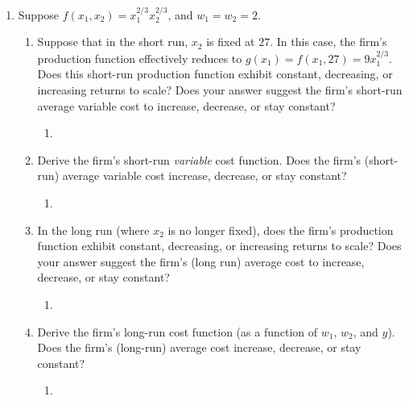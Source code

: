 \documentclass[11pt]{article}
\begin{document}
\begin{enumerate}
\item Suppose $f(x_{1},x_{2})=x_{1}^{2/3}x_{2}^{2/3}$, and $w_{1}=w_{2}=2$.
    \begin{enumerate}
        \item Suppose that in the short run, $x_{2}$ is fixed at $27$. In this case, the firm's production function effectively reduces to $g(x_{1})=f(x_{1},27)=9x_{1}^{2/3}$. Does this short-run production function exhibit constant, decreasing, or increasing returns to scale? Does your answer suggest the firm's short-run average variable cost to increase, decrease, or stay constant?
        \begin{enumerate}
            \item 
        \end{enumerate}

        \item Derive the firm's short-run \emph{variable} cost function. Does the firm's (short-run) average variable cost increase, decrease, or stay constant?
        \begin{enumerate}
            \item 
        \end{enumerate}

        \item In the long run (where $x_{2}$ is no longer fixed), does the firm's production function exhibit constant, decreasing, or increasing returns to scale? Does your answer suggest the firm's (long run) average cost to increase, decrease, or stay constant?
        \begin{enumerate}
            \item 
        \end{enumerate}

        \item Derive the firm's long-run cost function (as a function of $w_{1}$, $w_{2}$, and $y$). Does the firm's (long-run) average cost increase, decrease, or stay constant?
        \begin{enumerate}
            \item 
        \end{enumerate}
    \end{enumerate}

\end{enumerate}
\end{document}
